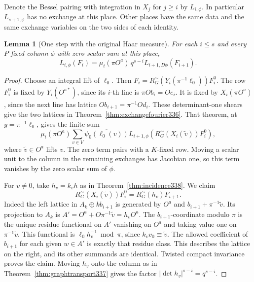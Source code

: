 \documentclass[a4paper,11pt]{article}
\newtheorem{lemma}[proposition]{Lemma}
\theoremstyle{definition}
\theoremstyle{remark}
\numberwithin{equation}{section}
\begin{document}
Denote the Bessel pairing with integration in \(X_j\) for
\(j\ge i\) by \(L_{i,\phi}\). In particular \(L_{s+1,\phi}\)
has no exchange at this place. Other places have the same data and
the same exchange variables on the two sides of each identity.
\begin{lemma}[One step with the original Haar measure]\label{lem:flagstep338}
For each \(i\le s\) and every \(P\)-fixed column \(\phi\) with
zero scalar sum at this place,
\[
 L_{i,\phi}(F_i)=\mu_i(\pi O^a)\,q^{s-i}
                                      L_{i+1,D\phi}(F_{i+1}).
\]
\end{lemma}
\begin{proof}
Choose an integral lift of \(\ell_0\). Then
\(F_i=R_G^\sim(Y_i(\pi^{-1}\ell_0))F_i^0\).
The row \(F_i^0\) is fixed by \(Y_i(O^{a*})\), since its
\(i\)-th line is \(\pi O b_i=O e_i\). It is fixed by
\(X_i(\pi O^a)\), since the next line has lattice
\(O b_{i+1}=\pi^{-1}O d_i\). These determinant-one shears
give the two lattices in Theorem~\ref{thm:exchangefourier336}.
That theorem, at \(y=\pi^{-1}\ell_0\), gives the finite sum
\[
 \mu_i(\pi O^a)\sum_{v\in V}
         \overline{\psi_0(\ell_0(v))}
             L_{i+1,\phi}(R_G^\sim(X_i(\widetilde v))F_i^0),
\]
where \(\widetilde v\in O^a\) lifts \(v\).
The zero term pairs with a \(K\)-fixed row. Moving a scalar
unit to the column in the remaining exchanges has Jacobian one,
so this term vanishes by the zero scalar sum of \(\phi\).

For \(v\ne0\), take \(h_v=k_v h\) as in Theorem~\ref{thm:incidence338}.
We claim
\[
          R_G^\sim(X_i(\widetilde v))F_i^0=R_G^\sim(h_v)F_{i+1}.
\]
Indeed the left lattice in \(A_k\oplus k b_{i+1}\) is generated
by \(O^a\) and \(b_{i+1}+\pi^{-1}\widetilde v\). Its projection
to \(A_k\) is \(A'=O^a+O\pi^{-1}\widetilde v=h_vO^a\).
The \(b_{i+1}\)-coordinate modulo \(\pi\) is the unique residue
functional on \(A'\) vanishing on \(O^a\) and taking value one on
\(\pi^{-1}\widetilde v\). This functional is
\(\ell_0 h_v^{-1}\bmod\pi\), since \(k_v v_0\equiv\widetilde v\).
The allowed coefficient of \(b_{i+1}\) for each given \(w\in A'\)
is exactly that residue class. This describes the lattice on the
right, and its other summands are identical. Twisted compact
invariance proves the claim. Moving \(h_v\) onto the column as in
Theorem~\ref{thm:graphtransport337} gives the factor
\(|\det h_v|^{s-i}=q^{s-i}\).


\end{proof}
\end{document}
